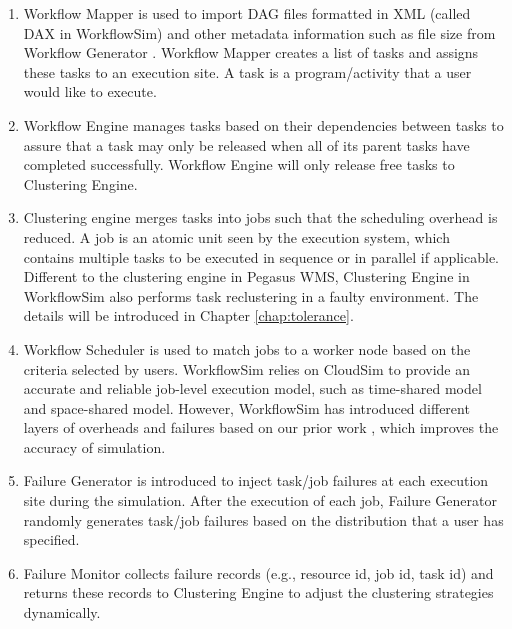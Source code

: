 \begin{enumerate}

\item {Workflow Mapper} is used to import DAG files formatted in XML (called DAX in WorkflowSim) and other metadata information such as file size from Workflow Generator \cite{WorkflowGenerator}. Workflow Mapper creates a list of tasks and assigns these tasks to an execution site. A task is a program/activity that a user would like to execute. 

\item{Workflow Engine} manages tasks based on their dependencies between tasks to assure that a task may only be released when all of its parent tasks have completed successfully. Workflow Engine will only release free tasks to Clustering Engine. 

\item{Clustering engine} merges tasks into jobs such that the scheduling overhead is reduced. A job is an atomic unit seen by the execution system, which contains multiple tasks to be executed in sequence or in parallel if applicable. Different to the clustering engine in Pegasus WMS, Clustering Engine in WorkflowSim also performs task reclustering in a faulty environment. The details will be introduced in Chapter \ref{chap:tolerance}. 

\item{Workflow Scheduler} is used to match jobs to a worker node based on the criteria selected by users. WorkflowSim relies on CloudSim to provide an accurate and reliable job-level execution model, such as time-shared model and space-shared model. However, WorkflowSim has introduced different layers of overheads and failures based on our prior work \cite{Chen2011}, which improves the accuracy of simulation. 

\item{Failure Generator} is introduced to inject task/job failures at each execution site during the simulation. After the execution of each job, Failure Generator randomly generates task/job failures based on the distribution that a user has specified. 

\item{Failure Monitor} collects failure records (e.g., resource id, job id, task id) and returns these records to Clustering Engine to adjust the clustering strategies dynamically. 

\end{enumerate}




